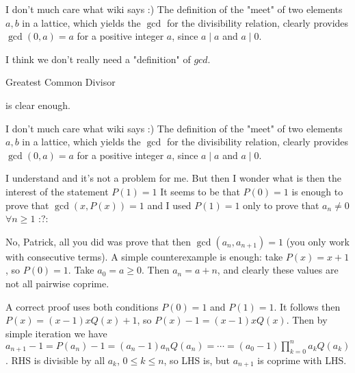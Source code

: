 \begin{solution}
	I don't much care what wiki says  :)  The definition of the "meet" of two elements $a,b$ in a lattice, which yields the $\gcd$ for the divisibility relation, clearly provides $\gcd(0,a) = a$ for a positive integer $a$, since $a \mid a$ and $a \mid 0$.
\end{solution}



\begin{solution}
	I think we don't really need a "definition" of $gcd$. \begin{italicized}Greatest Common Divisor\end{italicized} is clear enough.
\end{solution}



\begin{solution}
	\begin{tcolorbox}I don't much care what wiki says  :)  The definition of the "meet" of two elements $a,b$ in a lattice, which yields the $\gcd$ for the divisibility relation, clearly provides $\gcd(0,a) = a$ for a positive integer $a$, since $a \mid a$ and $a \mid 0$.\end{tcolorbox}
I understand and it's not a problem for me.
But then I wonder what is then the interest of the statement $P(1)=1$
It seems to be that $P(0)=1$ is enough to prove that $\gcd(x,P(x))=1$ and I used $P(1)=1$ only to prove that $a_n\ne 0$ $\forall n\ge 1$
:?:
\end{solution}



\begin{solution}
	No, Patrick, all you did was prove that then $\gcd(a_n,a_{n+1}) = 1$ (you only work with consecutive terms). A simple counterexample is enough: take $P(x) = x+1$, so $P(0)=1$. Take $a_0=a\geq 0$. Then $a_n = a + n$, and clearly these values are not all pairwise coprime.

A correct proof uses both conditions $P(0)=1$ and $P(1)=1$. It follows then $P(x) = (x-1)xQ(x) + 1$, so $P(x)-1 = (x-1)xQ(x)$. Then by simple iteration we have $a_{n+1} - 1= P(a_n) -1 = (a_n - 1)a_nQ(a_n) = \cdots = (a_0-1)\prod_{k=0}^n a_kQ(a_k)$. RHS is divisible by all $a_k$, $0\leq k\leq n$, so LHS is, but $a_{n+1}$ is coprime with LHS.
\end{solution}



